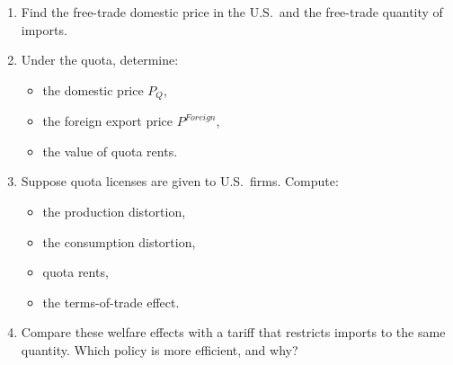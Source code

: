 \documentclass[12pt]{article}
\begin{document}
\begin{enumerate}[label=(\arabic*)]
\item Find the free-trade domestic price in the U.S.\ and the free-trade quantity of imports.
\item Under the quota, determine:
\begin{itemize}
    \item the domestic price $P_Q$,
    \item the foreign export price $P^{Foreign}$,
    \item the value of quota rents.
\end{itemize}
\item Suppose quota licenses are given to U.S.\ firms. Compute:
\begin{itemize}
    \item the production distortion,
    \item the consumption distortion,
    \item quota rents,
    \item the terms-of-trade effect.
\end{itemize}
\item Compare these welfare effects with a tariff that restricts imports to the same quantity. Which policy is more efficient, and why?
\end{enumerate}
\end{document}
